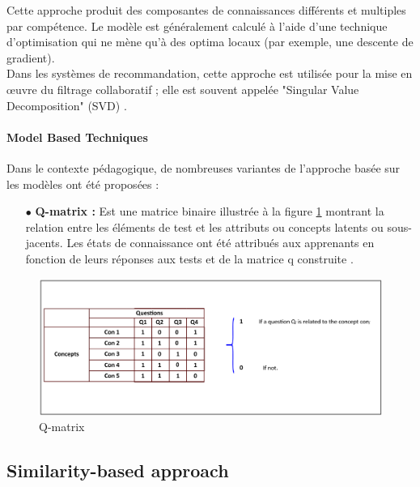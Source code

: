 Cette approche produit des composantes de connaissances différents et multiples par compétence. Le modèle est généralement calculé à l'aide d'une technique d'optimisation qui ne mène qu'à des optima locaux (par exemple, une descente de gradient). \\
Dans les systèmes de recommandation, cette approche est utilisée pour la mise en œuvre du filtrage collaboratif ; elle est souvent appelée "Singular Value Decomposition" (SVD) \cite{koren2011advances}. 

\paragraph{Model Based Techniques \\}
Dans le contexte pédagogique, de nombreuses variantes de l'approche basée sur les modèles ont été proposées :

\begin{itemize}
    \item[$\bullet$] \textbf{Q-matrix :} Est une matrice binaire illustrée à la figure \ref{q_matrix} montrant la relation entre les éléments de test et les attributs ou concepts latents ou sous-jacents. Les états de connaissance ont été attribués aux apprenants en fonction de leurs réponses aux tests et de la matrice q construite \cite{barnes2005q}.
\end{itemize}

\begin{figure}[H]
	\begin{center}
		\includegraphics[width=\textwidth]{images/chapitre3/q_matrix.png}
	\end{center}
	\caption{Q-matrix}
	\label{q_matrix}
\end{figure}

\subsection{Similarity-based approach}
